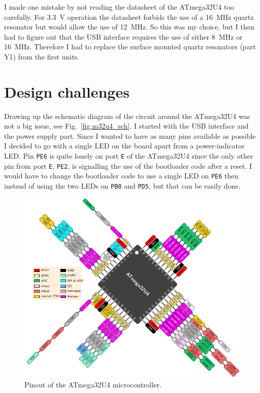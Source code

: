 \begin{multicols}{2}
I made one mistake by not reading the datasheet of the ATmega32U4 too carefully. For \SI{3.3}{\volt} operation
the datasheet forbids the use of a \SI{16}{\mega\hertz} quartz resonator but would allow the use
of \SI{12}{\mega\hertz}. So this was my choice, but I then had to figure out that the USB
interface requires the use of either \SI{8}{\mega\hertz} or \SI{16}{\mega\hertz}. Therefore I had to
replace the surface mounted quartz resonators (part Y1) from the first units.

\section{Design challenges}
Drawing up the schematic diagram of the circuit around the ATmega32U4 was not a big
issue, see Fig.~\ref{fig.m32u4_sch}. I started with the USB interface and the power supply part. Since I wanted to
have as many pins available as possible I decided to go with a single LED on the board
apart from a power-indicator LED. Pin \lstinline!PE6! is quite lonely on port \lstinline!E! of the ATmega32U4 since
the only other pin from port \lstinline!E!, \lstinline!PE2!, is signalling the use of the bootloader code after a reset.
I would have to change the bootloader code to use a single LED on \lstinline!PE6! then instead of using the
two LEDs on \lstinline!PB0! and \lstinline!PD5!, but that can be easily done.

\begin{figure}[H]
  \centering
  \includegraphics[width=\columnwidth]{20230210_atmega32u4_tqfp}
  \caption{Pinout of the ATmega32U4 microcontroller.}\label{fig.m32u4_chip}
\end{figure}


\end{multicols}
